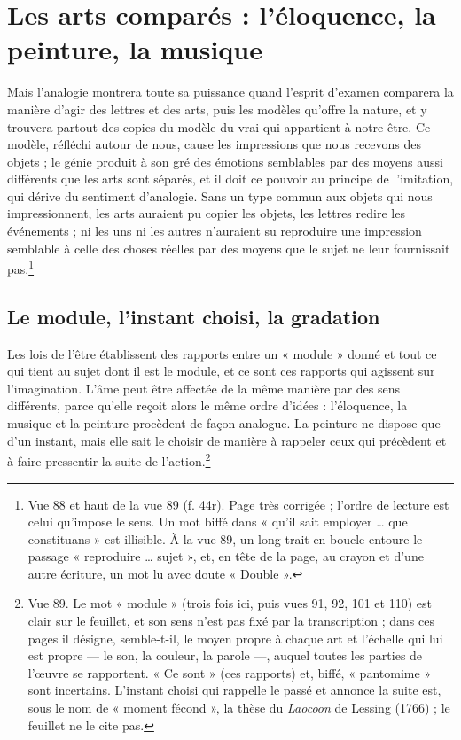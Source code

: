 \documentclass[11pt,a4paper]{article}
\begin{document}
\section*{Les arts comparés : l'éloquence, la peinture, la musique}

Mais l'analogie montrera toute sa puissance quand l'esprit d'examen comparera la
manière d'agir des lettres et des arts, puis les modèles qu'offre la nature, et y
trouvera partout des copies du modèle du vrai qui appartient à notre être. Ce
modèle, réfléchi autour de nous, cause les impressions que nous recevons des
objets ; le génie produit à son gré des émotions semblables par des moyens aussi
différents que les arts sont séparés, et il doit ce pouvoir au principe de
l'imitation, qui dérive du sentiment d'analogie. Sans un type commun aux objets
qui nous impressionnent, les arts auraient pu copier les objets, les lettres
redire les événements ; ni les uns ni les autres n'auraient su reproduire une
impression semblable à celle des choses réelles par des moyens que le sujet ne
leur fournissait pas.\footnote{Vue 88 et haut de la vue 89 (f. 44r). Page très
corrigée ; l'ordre de lecture est celui qu'impose le sens. Un mot biffé dans
« qu'il sait employer … que constituans » est illisible. À la vue 89, un long
trait en boucle entoure le passage « reproduire \ldots{} sujet », et, en tête de
la page, au crayon et d'une autre écriture, un mot lu avec doute « Double ».}

\subsection*{Le module, l'instant choisi, la gradation}

Les lois de l'être établissent des rapports entre un « module » donné et tout ce
qui tient au sujet dont il est le module, et ce sont ces rapports qui agissent sur
l'imagination. L'âme peut être affectée de la même manière par des sens
différents, parce qu'elle reçoit alors le même ordre d'idées : l'éloquence, la
musique et la peinture procèdent de façon analogue. La peinture ne dispose que
d'un instant, mais elle sait le choisir de manière à rappeler ceux qui précèdent
et à faire pressentir la suite de l'action.\footnote{Vue 89. Le mot « module »
(trois fois ici, puis vues 91, 92, 101 et 110) est clair sur le feuillet, et son
sens n'est pas fixé par la transcription ; dans ces pages il désigne, semble-t-il,
le moyen propre à chaque art et l'échelle qui lui est propre — le son, la
couleur, la parole —, auquel toutes les parties de l'œuvre se rapportent. « Ce
sont » (ces rapports) et, biffé, « pantomime » sont incertains. L'instant choisi
qui rappelle le passé et annonce la suite est, sous le nom de « moment fécond »,
la thèse du \emph{Laocoon} de Lessing (1766) ; le feuillet ne le cite pas.}
\end{document}
